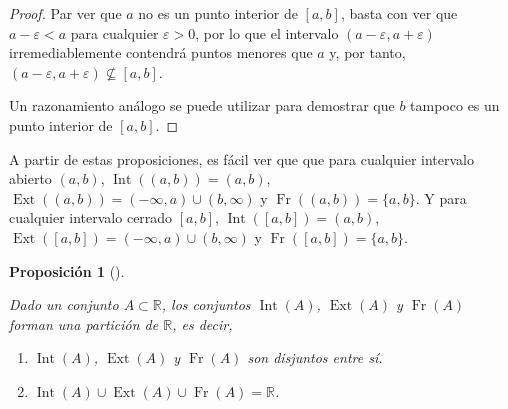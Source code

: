 \documentclass[
  a4paper,
]{scrreport}
\providecommand{\tightlist}{%
  \setlength{\itemsep}{0pt}\setlength{\parskip}{0pt}}\usepackage{longtable,booktabs,array}
\theoremstyle{definition}
\theoremstyle{plain}
\theoremstyle{definition}
\theoremstyle{definition}
\theoremstyle{plain}
\theoremstyle{plain}
\newtheorem{proposition}{Proposición}[chapter]
\theoremstyle{remark}
\begin{document}
\begin{tcolorbox}[enhanced jigsaw, leftrule=.75mm, colbacktitle=quarto-callout-note-color!10!white, toprule=.15mm, opacityback=0, opacitybacktitle=0.6, toptitle=1mm, breakable, bottomtitle=1mm, colframe=quarto-callout-note-color-frame, rightrule=.15mm, titlerule=0mm, title=\textcolor{quarto-callout-note-color}{\faInfo}\hspace{0.5em}{Demostración}, arc=.35mm, left=2mm, bottomrule=.15mm, colback=white, coltitle=black]

\begin{proof}
Par ver que \(a\) no es un punto interior de \([a,b]\), basta con ver
que \(a-\varepsilon < a\) para cualquier \(\varepsilon>0\), por lo que
el intervalo \((a-\varepsilon,a+\varepsilon)\) irremediablemente
contendrá puntos menores que \(a\) y, por tanto,
\((a-\varepsilon,a+\varepsilon)\not \subseteq [a,b]\).

Un razonamiento análogo se puede utilizar para demostrar que \(b\)
tampoco es un punto interior de \([a,b]\).
\end{proof}

\end{tcolorbox}

A partir de estas proposiciones, es fácil ver que que para cualquier
intervalo abierto \((a,b)\), \(\operatorname{Int}((a,b)) = (a,b)\),
\(\operatorname{Ext}((a,b)) = (-\infty,a)\cup (b,\infty)\) y
\(\operatorname{Fr}((a,b)) = \{a, b\}\). Y para cualquier intervalo
cerrado \([a,b]\), \(\operatorname{Int}([a,b]) = (a,b)\),
\(\operatorname{Ext}([a,b]) = (-\infty,a)\cup (b,\infty)\) y
\(\operatorname{Fr}([a,b]) = \{a, b\}\).

\begin{proposition}[]\protect\hypertarget{prp-clasifiacion-puntos}{}\label{prp-clasifiacion-puntos}

Dado un conjunto \(A\subset \mathbb{R}\), los conjuntos
\(\operatorname{Int}(A)\), \(\operatorname{Ext}(A)\) y
\(\operatorname{Fr}(A)\) forman una partición de \(\mathbb{R}\), es
decir,

\begin{enumerate}
\def\labelenumi{\alph{enumi}.}
\tightlist
\item
  \(\operatorname{Int}(A)\), \(\operatorname{Ext}(A)\) y
  \(\operatorname{Fr}(A)\) son disjuntos entre sí.
\item
  \(\operatorname{Int}(A)\cup \operatorname{Ext}(A)\cup \operatorname{Fr}(A) = \mathbb{R}\).
\end{enumerate}

\end{proposition}
\end{document}
